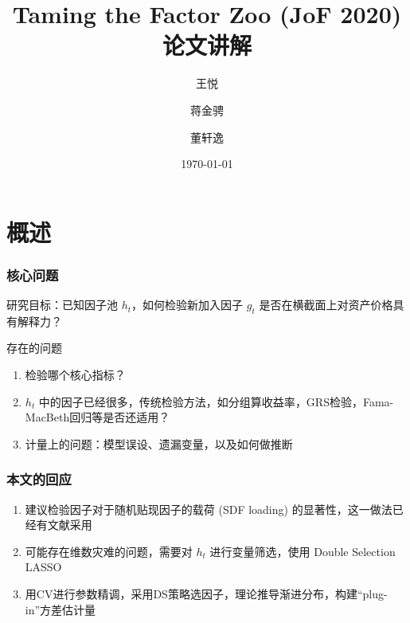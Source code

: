 \documentclass[
  UTF8,
  xcolor={dvipsnames,rgb},
  hyperref={colorlinks, citecolor=orange, linkcolor=black},
  aspectratio=169
  ]{beamer}
\title{Taming the Factor Zoo (JoF 2020) 论文讲解}
\date{\today}
\author{王悦 \and 蒋金骋 \and 董轩逸}
\institute{金融机器学习第一组}
\begin{document}
\begin{frame}
    \maketitle
\end{frame}

\begin{frame}
    \tableofcontents
\end{frame}

\section{概述}

\begin{frame}
    \frametitle{核心问题}

    \begin{wideitemize}
        \item 研究目标：已知因子池 \(h_{t}\)，如何检验新加入因子 \(g_{t}\) 是否在横截面上对资产价格具有解释力？
        \item 存在的问题 \begin{enumerate}
            \item 检验哪个核心指标？
            \item \(h_{t}\) 中的因子已经很多，传统检验方法，如分组算收益率\parencite{FamaJournalofFinancialEconomics1993}，GRS检验\parencite{GibbonsEconometrica1989}，Fama-MacBeth回归\parencite{FamaJ.Polit.Econ.1973}等是否还适用？
            \item 计量上的问题：模型误设、遗漏变量，以及如何做推断
        \end{enumerate}
    \end{wideitemize}
\end{frame}

\begin{frame}
    \frametitle{本文的回应}
    \begin{enumerate}
        \item \textcite{Cochrane2009,CochraneTheJournalofFinance2011}建议检验因子对于随机贴现因子的载荷 (SDF loading) 的显著性，这一做法已经有文献采用\parencite{KozakTheJournalofFinance2018,KozakJournalofFinancialEconomics2020}
        \item 可能存在维数灾难的问题，需要对 \(h_{t}\) 进行变量筛选，使用 Double Selection LASSO\parencite{BelloniTheReviewofEconomicStudies2014}
        \item 用CV进行参数精调，采用DS策略选因子，理论推导渐进分布，构建``plug-in''方差估计量
    \end{enumerate}
\end{frame}
\end{document}
